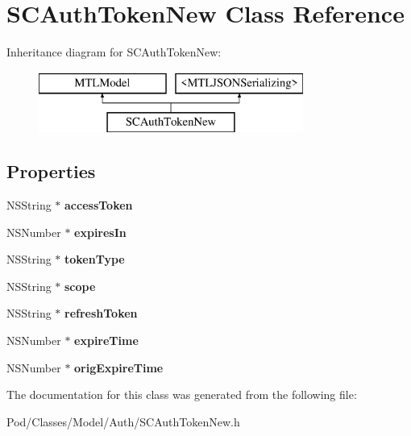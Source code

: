 \hypertarget{interface_s_c_auth_token_new}{}\section{S\+C\+Auth\+Token\+New Class Reference}
\label{interface_s_c_auth_token_new}
Inheritance diagram for S\+C\+Auth\+Token\+New\+:\begin{figure}[H]
\begin{center}
\leavevmode
\includegraphics[height=2.000000cm]{interface_s_c_auth_token_new}
\end{center}
\end{figure}
\subsection*{Properties}
\begin{DoxyCompactItemize}
\item 
N\+S\+String $\ast$ {\bfseries access\+Token}\hypertarget{interface_s_c_auth_token_new_a5581b68b163a445484de27fd5c0d3219}{}\label{interface_s_c_auth_token_new_a5581b68b163a445484de27fd5c0d3219}

\item 
N\+S\+Number $\ast$ {\bfseries expires\+In}\hypertarget{interface_s_c_auth_token_new_a454432b554079b22408ee82de5d5abdd}{}\label{interface_s_c_auth_token_new_a454432b554079b22408ee82de5d5abdd}

\item 
N\+S\+String $\ast$ {\bfseries token\+Type}\hypertarget{interface_s_c_auth_token_new_aa43dcfcb6f8824595b98259e2f02502b}{}\label{interface_s_c_auth_token_new_aa43dcfcb6f8824595b98259e2f02502b}

\item 
N\+S\+String $\ast$ {\bfseries scope}\hypertarget{interface_s_c_auth_token_new_abf31cc3fed7c0c54161f663c858ce068}{}\label{interface_s_c_auth_token_new_abf31cc3fed7c0c54161f663c858ce068}

\item 
N\+S\+String $\ast$ {\bfseries refresh\+Token}\hypertarget{interface_s_c_auth_token_new_aafc38a06ec04431db7af12b55a084484}{}\label{interface_s_c_auth_token_new_aafc38a06ec04431db7af12b55a084484}

\item 
N\+S\+Number $\ast$ {\bfseries expire\+Time}\hypertarget{interface_s_c_auth_token_new_a57eddc11485db83cfea07801b26218d7}{}\label{interface_s_c_auth_token_new_a57eddc11485db83cfea07801b26218d7}

\item 
N\+S\+Number $\ast$ {\bfseries orig\+Expire\+Time}\hypertarget{interface_s_c_auth_token_new_a932efb252513af869b70dfd071314116}{}\label{interface_s_c_auth_token_new_a932efb252513af869b70dfd071314116}

\end{DoxyCompactItemize}


The documentation for this class was generated from the following file\+:\begin{DoxyCompactItemize}
\item 
Pod/\+Classes/\+Model/\+Auth/S\+C\+Auth\+Token\+New.\+h\end{DoxyCompactItemize}

